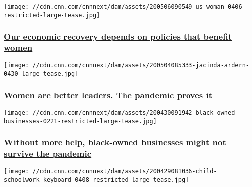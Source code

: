 \texttt{[image: //cdn.cnn.com/cnnnext/dam/assets/200506090549-us-woman-0406-restricted-large-tease.jpg]}

\hypertarget{our-economic-recovery-depends-on-policies-that-benefit-women}{%
\subsubsection{\texorpdfstring{\href{/2020/05/06/perspectives/women-economic-policies-coronavirus/index.html}{Our
economic recovery depends on policies that benefit
women}}{Our economic recovery depends on policies that benefit women}}\label{our-economic-recovery-depends-on-policies-that-benefit-women}}

\href{/2020/05/05/perspectives/women-leaders-coronavirus/index.html}{}

\texttt{[image: //cdn.cnn.com/cnnnext/dam/assets/200504085333-jacinda-ardern-0430-large-tease.jpg]}

\hypertarget{women-are-better-leaders-the-pandemic-proves-it}{%
\subsubsection{\texorpdfstring{\href{/2020/05/05/perspectives/women-leaders-coronavirus/index.html}{Women
are better leaders. The pandemic proves
it}}{Women are better leaders. The pandemic proves it}}\label{women-are-better-leaders-the-pandemic-proves-it}}

\href{/2020/04/30/perspectives/black-businesses-coronavirus/index.html}{}

\texttt{[image: //cdn.cnn.com/cnnnext/dam/assets/200430091942-black-owned-businesses-0221-restricted-large-tease.jpg]}

\hypertarget{without-more-help-black-owned-businesses-might-not-survive-the-pandemic}{%
\subsubsection{\texorpdfstring{\href{/2020/04/30/perspectives/black-businesses-coronavirus/index.html}{Without
more help, black-owned businesses might not survive the
pandemic}}{Without more help, black-owned businesses might not survive the pandemic}}\label{without-more-help-black-owned-businesses-might-not-survive-the-pandemic}}

\href{/2020/04/29/perspectives/fcc-broadband-access/index.html}{}

\texttt{[image: //cdn.cnn.com/cnnnext/dam/assets/200429081036-child-schoolwork-keyboard-0408-restricted-large-tease.jpg]}

